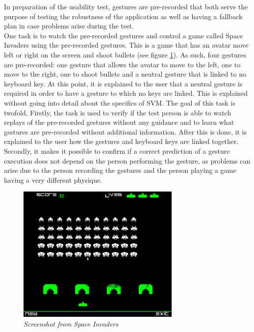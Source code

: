 In preparation of the usability test, gestures are pre-recorded that both serve the purpose of testing the robustness of the application as well as having a fallback plan in case problems arise during the test.\\

One task is to watch the pre-recorded gestures and control a game called Space Invaders using the pre-recorded gestures. This is a game that has an avatar move left or right on the screen and shoot bullets (see figure \ref{fig: space_invaders}). As such, four gestures are pre-recorded: one gesture that allows the avatar to move to the left, one to move to the right, one to shoot bullets and a neutral gesture that is linked to no keyboard key. At this point, it is explained to the user that a neutral gesture is required in order to have a gesture to which no keys are linked. This is explained without going into detail about the specifics of SVM. The goal of this task is twofold. Firstly, the task is used to verify if the test person is able to watch replays of the pre-recorded gestures without any guidance and to learn what gestures are pre-recorded without additional information. After this is done, it is explained to the user how the gestures and keyboard keys are linked together. Secondly, it makes it possible to confirm if a correct prediction of a gesture execution does not depend on the person performing the gesture, as problems can arise due to the person recording the gestures and the person playing a game having a very different physique.\\

\begin{figure}[H]
\begin{center}
\includegraphics[width=8cm]{SpaceInvaders.png}
\caption{\emph{Screenshot from Space Invaders}}
\label{fig: space_invaders}
\end{center}
\end{figure}

